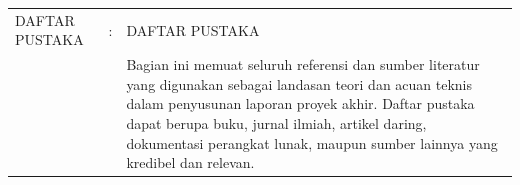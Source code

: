 \begin{longtable}{@{}llp{11cm}@{}}
    DAFTAR PUSTAKA & : & DAFTAR PUSTAKA                                                                                                                                                                                                                                                                                                                                                                                                                                                                                                                                                                                                                                                                                                                                                                                 \\
                   &   & Bagian ini memuat seluruh referensi dan sumber literatur yang digunakan sebagai landasan teori dan acuan teknis dalam penyusunan laporan proyek akhir. Daftar pustaka dapat berupa buku, jurnal ilmiah, artikel daring, dokumentasi perangkat lunak, maupun sumber lainnya yang kredibel dan relevan.                                                                                                                                                                                                                                                                                                                                                                                                                                                                                          \\[0.8em]


\end{longtable}
